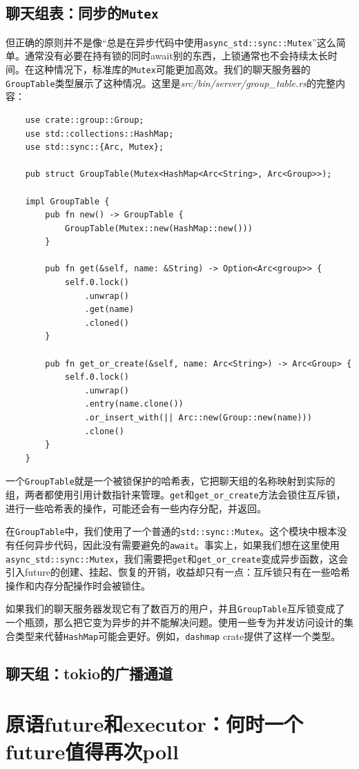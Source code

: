 \subsection{聊天组表：同步的\texttt{Mutex}}
但正确的原则并不是像“总是在异步代码中使用\texttt{async\_std::sync::Mutex}”这么简单。通常没有必要在持有锁的同时await别的东西，上锁通常也不会持续太长时间。在这种情况下，标准库的\texttt{Mutex}可能更加高效。我们的聊天服务器的\texttt{GroupTable}类型展示了这种情况。这里是\emph{src/bin/server/group\_table.rs}的完整内容：
\begin{verbatim}
    use crate::group::Group;
    use std::collections::HashMap;
    use std::sync::{Arc, Mutex};

    pub struct GroupTable(Mutex<HashMap<Arc<String>, Arc<Group>>);

    impl GroupTable {
        pub fn new() -> GroupTable {
            GroupTable(Mutex::new(HashMap::new()))
        }

        pub fn get(&self, name: &String) -> Option<Arc<group>> {
            self.0.lock()
                .unwrap()
                .get(name)
                .cloned()
        }

        pub fn get_or_create(&self, name: Arc<String>) -> Arc<Group> {
            self.0.lock()
                .unwrap()
                .entry(name.clone())
                .or_insert_with(|| Arc::new(Group::new(name)))
                .clone()
        }
    }
\end{verbatim}

一个\texttt{GroupTable}就是一个被锁保护的哈希表，它把聊天组的名称映射到实际的组，两者都使用引用计数指针来管理。\texttt{get}和\texttt{get\_or\_create}方法会锁住互斥锁，进行一些哈希表的操作，可能还会有一些内存分配，并返回。

在\texttt{GroupTable}中，我们使用了一个普通的\texttt{std::sync::Mutex}。这个模块中根本没有任何异步代码，因此没有需要避免的\texttt{await}。事实上，如果我们想在这里使用\texttt{async\_std::sync::Mutex}，我们需要把\texttt{get}和\texttt{get\_or\_create}变成异步函数，这会引入future的创建、挂起、恢复的开销，收益却只有一点：互斥锁只有在一些哈希操作和内存分配操作时会被锁住。

如果我们的聊天服务器发现它有了数百万的用户，并且\texttt{GroupTable}互斥锁变成了一个瓶颈，那么把它变为异步的并不能解决问题。使用一些专为并发访问设计的集合类型来代替\texttt{HashMap}可能会更好。例如，\texttt{dashmap} crate提供了这样一个类型。

\subsection{聊天组：tokio的广播通道}

\section{原语future和executor：何时一个future值得再次poll}\label{WhenPoll}
